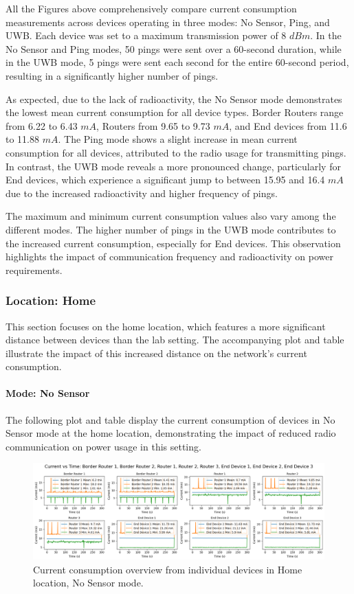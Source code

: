 All the Figures above comprehensively compare current consumption measurements across devices operating in three modes: No Sensor, Ping, and UWB. Each device was set to a maximum transmission power of 8 $dBm$. In the No Sensor and Ping modes, 50 pings were sent over a 60-second duration, while in the UWB mode, 5 pings were sent each second for the entire 60-second period, resulting in a significantly higher number of pings.

As expected, due to the lack of radioactivity, the No Sensor mode demonstrates the lowest mean current consumption for all device types. Border Routers range from 6.22 to 6.43 $mA$, Routers from 9.65 to 9.73 $mA$, and End devices from 11.6 to 11.88 $mA$. The Ping mode shows a slight increase in mean current consumption for all devices, attributed to the radio usage for transmitting pings. In contrast, the UWB mode reveals a more pronounced change, particularly for End devices, which experience a significant jump to between 15.95 and 16.4 $mA$ due to the increased radioactivity and higher frequency of pings.

The maximum and minimum current consumption values also vary among the different modes. The higher number of pings in the UWB mode contributes to the increased current consumption, especially for End devices. This observation highlights the impact of communication frequency and radioactivity on power requirements.

\subsubsection{Location: Home}
This section focuses on the home location, which features a more significant distance between devices than the lab setting. The accompanying plot and table illustrate the impact of this increased distance on the network's current consumption.

\paragraph{Mode: No Sensor}
The following plot and table display the current consumption of devices in No Sensor mode at the home location, demonstrating the impact of reduced radio communication on power usage in this setting.

\begin{figure}[H]
  \centering
  \includegraphics[width=1\textwidth]{images/research_results/current_consumption_analysis/maximum/home/no_sensor/overview.png}
    \caption{Current consumption overview from individual devices in Home location, No Sensor mode.}
    \label{fig:current_consumption_home_no-sensor_overview}
\end{figure}

